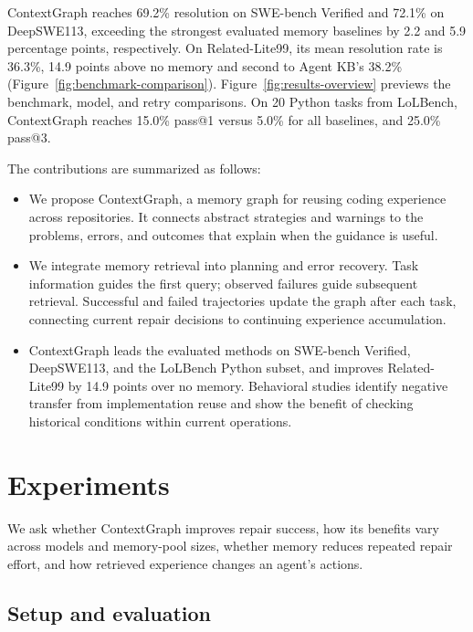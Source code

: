 \documentclass{article}
\begin{document}
ContextGraph reaches 69.2\% resolution on SWE-bench Verified and 72.1\% on
DeepSWE113, exceeding the strongest evaluated memory baselines by 2.2 and
5.9 percentage points, respectively. On Related-Lite99,
its mean resolution rate is 36.3\%, 14.9 points above no memory and second
to Agent KB's 38.2\% (Figure~\ref{fig:benchmark-comparison}).
Figure~\ref{fig:results-overview} previews the benchmark, model, and retry
comparisons. On 20 Python tasks
from LoLBench, ContextGraph reaches 15.0\% pass@1 versus 5.0\% for all
baselines, and 25.0\% pass@3.

\noindent The contributions are summarized as follows:
\begin{itemize}
\item We propose ContextGraph, a memory graph for reusing coding experience
across repositories. It connects abstract strategies and warnings to the
problems, errors, and outcomes that explain when the guidance is useful.
\item We integrate memory retrieval into planning and error recovery.
Task information guides the first query; observed failures guide subsequent
retrieval. Successful and failed trajectories update the graph after each
task, connecting current repair decisions to continuing experience accumulation.
\item ContextGraph leads the evaluated methods on SWE-bench Verified,
DeepSWE113, and the LoLBench Python subset, and improves Related-Lite99 by
14.9 points over no memory. Behavioral studies identify negative transfer
from implementation reuse and show the benefit of checking historical
conditions within current operations.
\end{itemize}
\endgroup





\section{Experiments}
\label{sec:experiments}
\label{sec:recorded-results}
We ask whether ContextGraph improves repair success, how its benefits vary
across models and memory-pool sizes, whether memory reduces repeated repair
effort, and how retrieved experience changes an agent's actions.

\subsection{Setup and evaluation}
\label{sec:setup}
\end{document}

